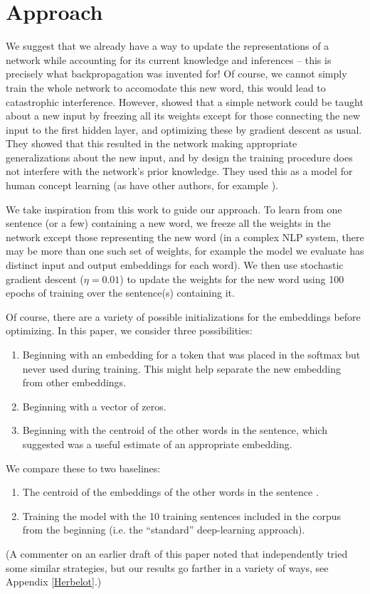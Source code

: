 \documentclass{article}
\begin{document}
\section{Approach}
We suggest that we already have a way to update the representations of a network while accounting for its current knowledge and inferences -- this is precisely what backpropagation was invented for! Of course, we cannot simply train the whole network to accomodate this new word, this would lead to catastrophic interference. However, \citet{Rumelhart1993} showed that a simple network could be taught about a new input by freezing all its weights except for those connecting the new input to the first hidden layer, and optimizing these by gradient descent as usual. They showed that this resulted in the network making appropriate generalizations about the new input, and by design the training procedure does not interfere with the network's prior knowledge. They used this as a model for human concept learning (as have other authors, for example \citet{Rogers2004}). \par
We take inspiration from this work to guide our approach. To learn from one sentence (or a few) containing a new word, we freeze all the weights in the network except those representing the new word (in a complex NLP system, there may be more than one such set of weights, for example the model we evaluate has distinct input and output embeddings for each word). We then use stochastic gradient descent (\(\eta = 0.01\)) to update the weights for the new word using 100 epochs of training over the sentence(s) containing it. \par
Of course, there are a variety of possible initializations for the embeddings before optimizing. In this paper, we consider three possibilities: 
\vspace{-0.5em}
\begin{enumerate}
\setlength\itemsep{0em}
\item Beginning with an embedding for a token that was placed in the softmax but never used during training. This might help separate the new embedding from other embeddings. 
\item Beginning with a vector of zeros.
\item Beginning with the centroid of the other words in the sentence, which \citet{Lazaridou2017} suggested was a useful estimate of an appropriate embedding.
\end{enumerate}
\vspace{-0.5em}
We compare these to two baselines:
\vspace{-0.5em}
\begin{enumerate}
\setlength\itemsep{0em}
\item The centroid of the embeddings of the other words in the sentence \citet{Lazaridou2017}. 
\item Training the model with the 10 training sentences included in the corpus from the beginning (i.e. the ``standard'' deep-learning approach).
\end{enumerate}
(A commenter on an earlier draft of this paper noted that \cite{Herbelot2017} independently tried some similar strategies, but our results go farther in a variety of ways, see Appendix \ref{Herbelot}.)
\end{document}
